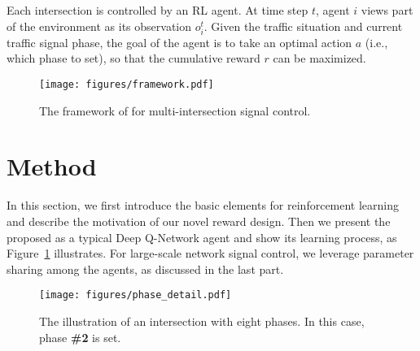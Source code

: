 \begin{problem}
Each intersection is controlled by an RL agent. At time step $t$, agent $i$ views part of the environment as its observation $o^t_i$. Given the traffic situation and current traffic signal phase, the goal of the agent is to take an optimal action $a$ (i.e., which phase to set), so that the cumulative reward $r$ can be maximized. 
\end{problem}

\begin{figure}[]
\centering
\texttt{[image: figures/framework.pdf]}
\caption{The framework of \PressLight for multi-intersection signal control.}%
\label{fig:framework}
\end{figure}


\section{Method}

In this section, we first introduce the basic elements for reinforcement learning and describe the motivation of our novel reward design. Then we present the proposed \PressLight as a typical Deep Q-Network agent and show its learning process, as Figure~\ref{fig:framework} illustrates. For large-scale network signal control, we leverage parameter sharing among the agents, as discussed in the last part.

\begin{figure}[t!]
\centering
\texttt{[image: figures/phase\_detail.pdf]} 
\caption{The illustration of an intersection with eight phases. In this case, phase \textbf{\#2} is set.}
\label{fig:phase}
\end{figure}


